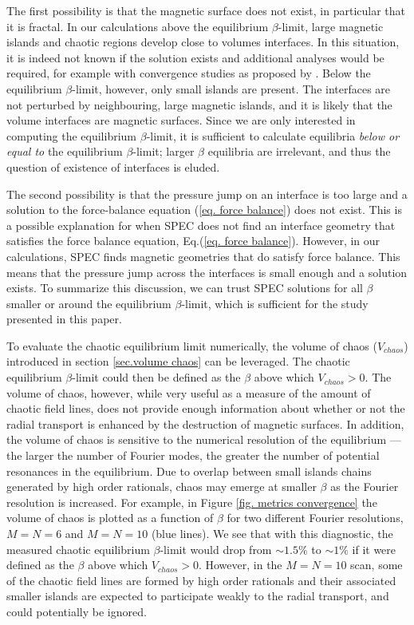 \documentclass[my_thesis.tex]{subfiles}
\begin{document}

The first possibility is that the magnetic surface does not exist, in particular that it is fractal. In our calculations above the equilibrium $\beta$-limit, large magnetic islands and chaotic regions develop close to volumes interfaces. In this situation, it is indeed not known if the solution exists and additional analyses would be required, for example with convergence studies as proposed by \citet{Qu2021}.  Below the equilibrium $\beta$-limit, however, only small islands are present. The interfaces are not perturbed by neighbouring, large magnetic islands, and it is likely that the volume interfaces are magnetic surfaces. Since we are only interested in computing the equilibrium $\beta$-limit, it is sufficient to calculate equilibria \emph{below or equal to} the equilibrium $\beta$-limit; larger $\beta$ equilibria are irrelevant, and thus the question of existence of interfaces is eluded.

The second possibility is that the pressure jump on an interface is too large and a solution to the force-balance equation (\ref{eq. force balance}) does not exist. This is a possible explanation for when SPEC does not find an interface geometry that satisfies the force balance equation, Eq.(\ref{eq. force balance}). However, in our calculations, SPEC finds magnetic geometries that do satisfy force balance. This means that the pressure jump across the interfaces is small enough and a solution exists. To summarize this discussion, we can trust SPEC solutions for all $\beta$ smaller or around the equilibrium $\beta$-limit, which is sufficient for the study presented in this paper.

To evaluate the chaotic equilibrium limit numerically, the volume of chaos ($V_{chaos}$) introduced in section \ref{sec.volume chaos} can be leveraged. The chaotic equilibrium $\beta$-limit could then be defined as the $\beta$ above which $V_{chaos}>0$. The volume of chaos, however, while very useful as a measure of the amount of chaotic field lines, does not provide enough information about whether or not the radial transport is enhanced by the destruction of magnetic surfaces. In addition, the volume of chaos is sensitive to the numerical resolution of the equilibrium --- the larger the number of Fourier modes, the greater the number of potential resonances in the equilibrium. Due to overlap between small islands chains generated by high order rationals, chaos may emerge at smaller $\beta$ as the Fourier resolution is increased. For example, in Figure \ref{fig. metrics convergence} the volume of chaos is plotted as a function of $\beta$ for two different Fourier resolutions, $M=N=6$ and $M=N=10$ (blue lines). We see that with this diagnostic, the measured chaotic equilibrium $\beta$-limit would drop from $\sim 1.5\%$ to $\sim 1\%$ if it were defined as the $\beta$ above which $V_{chaos}>0$. However, in the $M=N=10$ scan, some of the chaotic field lines are formed by high order rationals and their associated smaller islands are expected to participate weakly to the radial transport, and could potentially be ignored.
\end{document}
